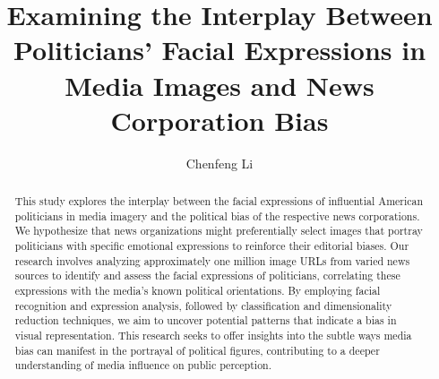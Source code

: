 \documentclass[sigconf]{acmart}
\begin{document}
\title{Examining the Interplay Between Politicians' Facial Expressions in Media Images and News Corporation Bias}



\author{Chenfeng Li}

\renewcommand{\shortauthors}{Chenfeng Li}

\begin{abstract}
   This study explores the interplay between the facial expressions of influential American politicians in media imagery and the political bias of the respective news corporations. We hypothesize that news organizations might preferentially select images that portray politicians with specific emotional expressions to reinforce their editorial biases. Our research involves analyzing approximately one million image URLs from varied news sources to identify and assess the facial expressions of politicians, correlating these expressions with the media's known political orientations. By employing facial recognition and expression analysis, followed by classification and dimensionality reduction techniques, we aim to uncover potential patterns that indicate a bias in visual representation. This research seeks to offer insights into the subtle ways media bias can manifest in the portrayal of political figures, contributing to a deeper understanding of media influence on public perception.
\end{abstract}
\end{document}
